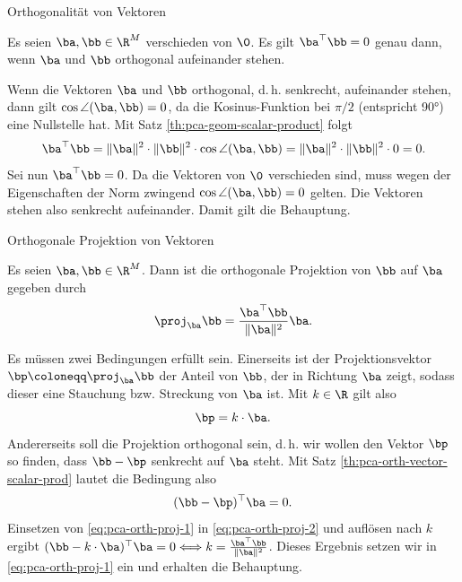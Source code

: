 \begin{frame}{Orthogonalität von Vektoren}{}
	\begin{mytheo}
		Es seien $\ba, \bb \in \R^M$ verschieden von $\0$. Es gilt $\ba^\top \bb = 0$ genau dann,
		wenn $\ba$ und $\bb$ orthogonal aufeinander stehen.
	\end{mytheo}

	\begin{myproof}
		Wenn die Vektoren $\ba$ und $\bb$ orthogonal, d.\,h. senkrecht, aufeinander stehen, dann gilt
		$\cos \angle(\ba, \bb) = 0$, da die Kosinus-Funktion bei $\pi/2$ (entspricht 90°) eine Nullstelle hat.
		Mit Satz \ref{th:pca-geom-scalar-product} folgt
		\begin{equation*}
			\ba^\top \bb
				= \Vert \ba \Vert^2 \cdot \Vert \bb \Vert^2 \cdot \cos \angle(\ba, \bb)
				= \Vert \ba \Vert^2 \cdot \Vert \bb \Vert^2 \cdot 0
				= 0.
		\end{equation*}
		Sei nun $\ba^\top \bb = 0$. Da die Vektoren von $\0$ verschieden sind, muss wegen der Eigenschaften der Norm
		zwingend $\cos \angle(\ba, \bb) = 0$ gelten. Die Vektoren stehen also senkrecht aufeinander. Damit gilt die Behauptung.
	\end{myproof}
\end{frame}


\begin{frame}{Orthogonale Projektion von Vektoren}{}
	\begin{mytheo}
		Es seien $\ba, \bb \in \R^M$. Dann ist die orthogonale Projektion von $\bb$ auf $\ba$ gegeben durch
		\begin{equation*}
			\proj_{\ba} \bb = \frac{\ba^\top \bb}{\Vert \ba \Vert^2} \ba.
		\end{equation*}
	\end{mytheo}

	\begin{myproof}
		Es müssen zwei Bedingungen erfüllt sein. Einerseits ist der Projektionsvektor
		$\bp \coloneqq \proj_{\ba} \bb$ der Anteil von $\bb$,
		der in Richtung $\ba$ zeigt, sodass dieser eine Stauchung bzw. Streckung von $\ba$ ist. Mit $k \in \R$ gilt also
		\begin{equation} \label{eq:pca-orth-proj-1}
			\bp = k \cdot \ba.
		\end{equation}
		Andererseits soll die Projektion orthogonal sein, d.\,h. wir wollen den Vektor $\bp$ so finden,
		dass $\bb - \bp$ senkrecht auf $\ba$ steht. Mit Satz \ref{th:pca-orth-vector-scalar-prod} lautet die Bedingung also
		\begin{equation} \label{eq:pca-orth-proj-2}
			(\bb - \bp)^\top \ba = 0.
		\end{equation}
		Einsetzen von \eqref{eq:pca-orth-proj-1} in \eqref{eq:pca-orth-proj-2} und auflösen nach $k$ ergibt
		$(\bb - k \cdot \ba)^\top \ba = 0 \Longleftrightarrow k = \frac{\ba^\top \bb}{\Vert \ba \Vert^2}$.
		Dieses Ergebnis setzen wir in \eqref{eq:pca-orth-proj-1} ein und erhalten die Behauptung.
	\end{myproof}
\end{frame}


